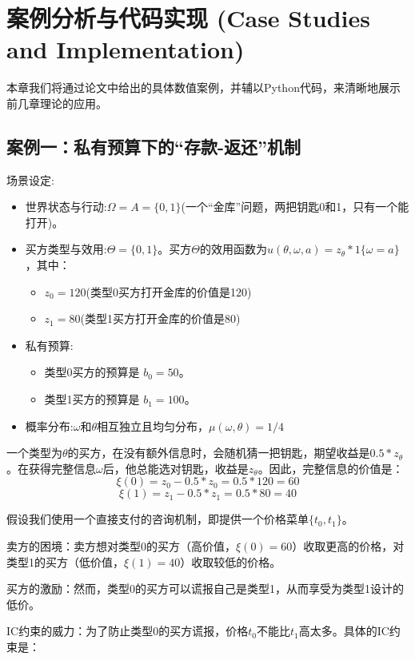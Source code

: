 \section{案例分析与代码实现 (Case Studies and Implementation)}

本章我们将通过论文中给出的具体数值案例，并辅以Python代码，来清晰地展示前几章理论的应用。

\subsection{案例一：私有预算下的“存款-返还”机制}

场景设定:
\begin{itemize}
    \item 世界状态与行动:$\Omega=A=\{0,1\}$(一个“金库”问题，两把钥匙0和1，只有一个能打开)。
    \item 买方类型与效用:$\Theta=\{0,1\}$。买方$\Theta$的效用函数为$u(\theta,\omega,a)=z_{\theta}* 1\{\omega=a\}$，其中：
       \begin{itemize}
          \item $z_0 = 120$(类型0买方打开金库的价值是120)
          \item $z_1= 80$(类型1买方打开金库的价值是80)
       \end{itemize}
    \item 私有预算:
       \begin{itemize}
          \item 类型0买方的预算是 $b_0 = 50$。
          \item 类型1买方的预算是 $b_1 = 100$。
       \end{itemize}
    \item 概率分布:$\omega$和$\theta$相互独立且均匀分布，$\mu(\omega,\theta)= 1/4$
\end{itemize}

一个类型为$\theta$的买方，在没有额外信息时，会随机猜一把钥匙，期望收益是$0.5* z_\theta$。在获得完整信息$\omega$后，他总能选对钥匙，收益是$z_\theta$。因此，完整信息的价值是：
$$\xi(0) = z_0 - 0.5 * z_0 = 0.5 * 120 = 60$$
$$\xi(1) = z_1 - 0.5 * z_1 = 0.5 * 80 = 40$$

假设我们使用一个直接支付的咨询机制，即提供一个价格菜单$\{t_0,t_1\}$。

卖方的困境：卖方想对类型0的买方（高价值，$\xi(0)=60$）收取更高的价格，对类型1的买方（低价值，$\xi(1)=40$）收取较低的价格。

买方的激励：然而，类型0的买方可以谎报自己是类型1，从而享受为类型1设计的低价。

IC约束的威力：为了防止类型0的买方谎报，价格$t_0$不能比$t_1$高太多。具体的IC约束是：

